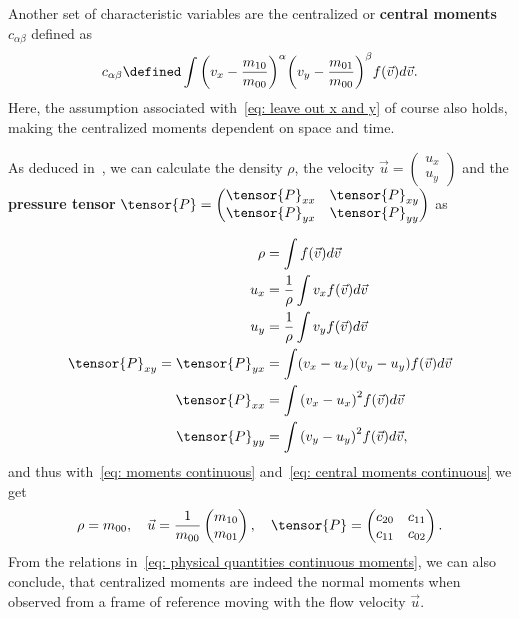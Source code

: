 Another set of characteristic variables are the centralized or \textbf{central moments} $c_{\alpha\beta}$ defined as
\begin{equation}
  \label{eq: central moments continuous}
  c_{\alpha\beta} \defined \int {\left(v_x - \frac{m_{10}}{m_{00}}\right)}^\alpha {\left(v_y-\frac{m_{01}}{m_{00}}\right)}^\beta f(\vec{v})  d\vec{v}.
\end{equation}
Here, the assumption associated with~\eqref{eq: leave out x and y} of course also holds, making the centralized moments dependent on space and time.

As deduced in~\cite[pages 23 ff.]{harris2004introduction}, we can calculate the density $\rho$, the velocity $\vec{u}=\begin{pmatrix}u_x\\u_y\end{pmatrix}$ and the
\textbf{pressure tensor} $\tensor{P}=\begin{pmatrix}\tensor{P}_{xx}&\tensor{P}_{xy}\\ \tensor{P}_{yx}&\tensor{P}_{yy}\end{pmatrix}$ as

\begin{equation}
  \label{eq: physical quantities continuous}
  \begin{aligned}
    \rho & = \int f(\vec{v}) d\vec{v} \\
    u_x
    & = \frac{1}{\rho}\int v_x f(\vec{v}) d\vec{v} \\
    u_y
    & = \frac{1}{\rho}\int v_y f(\vec{v}) d\vec{v}\\
    \tensor{P}_{xy}=\tensor{P}_{yx}
    & = \int (v_x - u_x)(v_y - u_y) f(\vec{v}) d\vec{v} \\
    \tensor{P}_{xx}
    & = \int {(v_x - u_x)}^2 f(\vec{v}) d\vec{v} \\
    \tensor{P}_{yy}
    & = \int {(v_y - u_y)}^2 f(\vec{v}) d\vec{v},
  \end{aligned}
\end{equation}
and thus with~\eqref{eq: moments continuous} and~\eqref{eq: central moments continuous} we get
\begin{equation}
  \label{eq: physical quantities continuous moments}
\rho = m_{00}, \quad \vec{u}=\frac{1}{m_{00}}\begin{pmatrix}m_{10}\\m_{01}\end{pmatrix},\quad \tensor{P}=\begin{pmatrix}c_{20}&c_{11}\\ c_{11}&c_{02}\end{pmatrix}.
\end{equation}
From the relations in~\eqref{eq: physical quantities continuous moments}, we can also conclude, that centralized moments are indeed the normal moments when observed from a frame of reference moving with the flow velocity $\vec{u}$.

